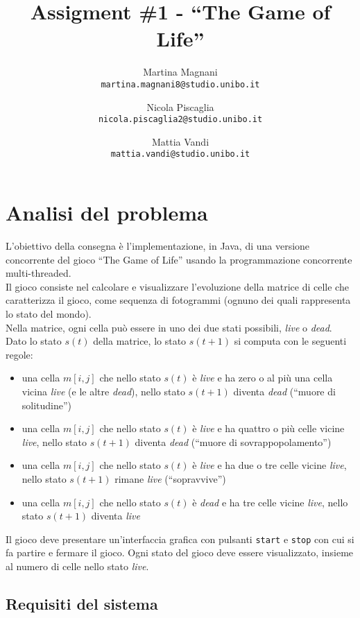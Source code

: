 \documentclass[a4paper]{article}
\title{\LARGE \bf
Assigment \#1 - ``The Game of Life''
}
\author{
    Martina Magnani\\
    \texttt{martina.magnani8@studio.unibo.it}
    \and
    Nicola Piscaglia\\
    \texttt{nicola.piscaglia2@studio.unibo.it}
    \and
    Mattia Vandi\\
    \texttt{mattia.vandi@studio.unibo.it}
}
\date{}
\begin{document}
\maketitle
\section{Analisi del problema}\label{analisi-del-problema}

L'obiettivo della consegna è l'implementazione, in Java, di una versione concorrente del gioco ``The Game of Life'' usando la programmazione concorrente multi-threaded.\\
Il gioco consiste nel calcolare e visualizzare l'evoluzione della
matrice di celle che caratterizza il gioco, come sequenza di fotogrammi (ognuno dei quali rappresenta lo stato del mondo).\\
Nella matrice, ogni cella può essere in uno dei due stati possibili, \emph{live} o \emph{dead}.\\
Dato lo stato \(s\left(t\right)\) della matrice, lo stato \(s\left(t + 1\right)\) si computa con le seguenti regole:

\begin{itemize}
\item
  una cella \(m\left[i,j\right]\) che nello stato \(s\left(t\right)\) è \emph{live} e ha zero o al più una cella vicina \emph{live} (e le altre \emph{dead}), nello stato \(s\left(t + 1\right)\) diventa \emph{dead} (``muore di solitudine'')
\item
  una cella \(m\left[i,j\right]\) che nello stato \(s\left(t\right)\) è \emph{live} e ha quattro o più celle vicine \emph{live}, nello stato \(s\left(t + 1\right)\) diventa \emph{dead} (``muore di sovrappopolamento'')
\item
  una cella \(m\left[i,j\right]\) che nello stato \(s\left(t\right)\) è \emph{live} e ha due o tre celle vicine \emph{live}, nello stato \(s\left(t + 1\right)\) rimane \emph{live} (``sopravvive'')
\item
  una cella \(m\left[i,j\right]\) che nello stato \(s\left(t\right)\) è \emph{dead} e ha tre celle vicine \emph{live}, nello stato \(s\left(t + 1\right)\) diventa \emph{live}
\end{itemize}
Il gioco deve presentare un'interfaccia grafica con pulsanti \texttt{start} e \texttt{stop} con cui si fa partire e fermare il gioco.
Ogni stato del gioco deve essere visualizzato, insieme al numero di celle nello stato \emph{live}.

\subsection{Requisiti del sistema}\label{requisiti-del-sistema}
\end{document}
